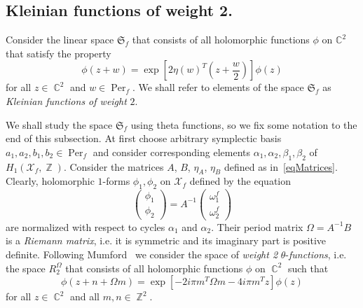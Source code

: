 \documentclass{amsart}
\numberwithin{equation}{section}
\theoremstyle{definition}
\theoremstyle{remark}
\DeclareMathOperator{\CC}{\mathbb C}
\DeclareMathOperator{\ZZ}{\mathbb Z}
\DeclareMathOperator{\Per}{Per}
\begin{document}
	\subsection{Kleinian functions of weight 2.}
	Consider the linear space $\mathfrak S_f$ that consists of all holomorphic functions $\phi$ on $\mathbb C^2$ that satisfy the property
	\begin{equation}\label{eqSpaceDef}
		\phi(z + w) = \exp\left[2\eta(w)^T\left(z + \frac{w}{2}\right)\right]\phi(z)
	\end{equation}
	for all $z \in \CC^2$ and $w \in \Per_f$. We shall refer to elements of the space $\mathfrak S_f$ as {\it{Kleinian functions of weight}} $2$.
	
	We shall study the space $\mathfrak S_f$ using theta functions, so we fix some notation to the end of this subsection. At first choose arbitrary symplectic basis $a_1, a_2, b_1, b_2 \in \Per_f$ and consider corresponding elements $\alpha_1, \alpha_2, \beta_1, \beta_2$ of $H_1(\mathcal X_f, \ZZ)$. Consider the matrices $A$, $B$, $\eta_A$, $\eta_B$ defined as in~\eqref{eqMatrices}. Clearly, holomorphic $1$-forms $\phi_1, \phi_2$ on $\mathcal X_f$ defined by the equation
	\begin{equation}\label{eqNormalizedDifferentials}
		\begin{pmatrix}
			\phi_1 \\ \phi_2
		\end{pmatrix} = A^{-1}\begin{pmatrix}
			\omega^f_1 \\ \omega^f_2
		\end{pmatrix}
	\end{equation}
	are normalized with respect to cycles $\alpha_1$ and $\alpha_2$. Their period matrix $\Omega = A^{-1}B$ is a {\it{Riemann matrix}}, i.e. it is symmetric and its imaginary part is positive definite. Following Mumford~\cite[Definition~II.1.2]{mumfordI} we consider the space of {\it{weight 2}} $\theta$-{\it{functions}}, i.e. the space $R_2^\Omega$ that consists of all holomorphic functions $\phi$ on $\CC^2$ such that 
	\[
	\phi(z + n + \Omega m) = \exp\left[-2i\pi m^T \Omega m -4i\pi m^T z\right]\phi(z)
	\]
	for all $z \in \CC^2$ and all $m,n \in \ZZ^2$. 
	
\end{document}
